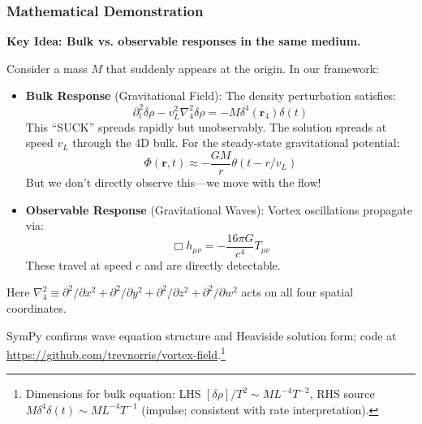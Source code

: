 \subsubsection{Mathematical Demonstration}

\textbf{Key Idea: Bulk vs. observable responses in the same medium.}

Consider a mass $M$ that suddenly appears at the origin. In our framework:

\begin{itemize}
\item \textbf{Bulk Response} (Gravitational Field): The density perturbation satisfies:
\begin{equation}
\partial_t^2 \delta\rho - v_L^2 \nabla_4^2 \delta\rho = -M\delta^4(\mathbf{r}_4)\delta(t)
\end{equation}
This ``SUCK'' spreads rapidly but unobservably. The solution spreads at speed $v_L$ through the 4D bulk. For the steady-state gravitational potential:
\begin{equation}
\Phi(\mathbf{r},t) \approx -\frac{GM}{r} \theta(t - r/v_L)
\end{equation}
But we don't directly observe this---we move with the flow!

\item \textbf{Observable Response} (Gravitational Waves): Vortex oscillations propagate via:
\begin{equation}
\Box h_{\mu\nu} = -\frac{16\pi G}{c^4} T_{\mu\nu}
\end{equation}
These travel at speed $c$ and are directly detectable.
\end{itemize}

Here $\nabla_4^2 \equiv \partial^2/\partial x^2 + \partial^2/\partial y^2 + \partial^2/\partial z^2 + \partial^2/\partial w^2$ acts on all four spatial coordinates.



SymPy confirms wave equation structure and Heaviside solution form; code at \url{https://github.com/trevnorris/vortex-field}.\footnote{Dimensions for bulk equation: LHS $[\delta\rho] / T^2 \sim M L^{-4} T^{-2}$, RHS source $M \delta^4 \delta(t) \sim M L^{-4} T^{-1}$ (impulse; consistent with rate interpretation).}


